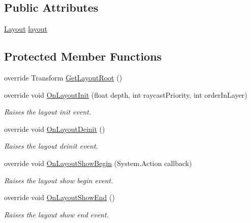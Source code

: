 \subsection*{Public Attributes}
\begin{DoxyCompactItemize}
\item 
\hyperlink{class_unity_engine_1_1_u_i_1_1_windows_1_1_types_1_1_layout}{Layout} \hyperlink{class_unity_engine_1_1_u_i_1_1_windows_1_1_types_1_1_layout_window_type_aac7a6f13d9873bb939b88f6f0e653866}{layout}
\end{DoxyCompactItemize}
\subsection*{Protected Member Functions}
\begin{DoxyCompactItemize}
\item 
override Transform \hyperlink{class_unity_engine_1_1_u_i_1_1_windows_1_1_types_1_1_layout_window_type_aaf0d9668fd474249fcd8f6f0bc7039e6}{Get\+Layout\+Root} ()
\item 
override void \hyperlink{class_unity_engine_1_1_u_i_1_1_windows_1_1_types_1_1_layout_window_type_ab2749bd8b74360304b44be574ad7825e}{On\+Layout\+Init} (float depth, int raycast\+Priority, int order\+In\+Layer)
\begin{DoxyCompactList}\small\item\em Raises the layout init event. \end{DoxyCompactList}\item 
override void \hyperlink{class_unity_engine_1_1_u_i_1_1_windows_1_1_types_1_1_layout_window_type_a3b98f0986a1e0ec4afeb6291857100cd}{On\+Layout\+Deinit} ()
\begin{DoxyCompactList}\small\item\em Raises the layout deinit event. \end{DoxyCompactList}\item 
override void \hyperlink{class_unity_engine_1_1_u_i_1_1_windows_1_1_types_1_1_layout_window_type_a63ea1b1a9fc020e1b4c559f037069c6e}{On\+Layout\+Show\+Begin} (System.\+Action callback)
\begin{DoxyCompactList}\small\item\em Raises the layout show begin event. \end{DoxyCompactList}\item 
override void \hyperlink{class_unity_engine_1_1_u_i_1_1_windows_1_1_types_1_1_layout_window_type_a7ccf902193f6a7531f414f2ad1952711}{On\+Layout\+Show\+End} ()
\begin{DoxyCompactList}\small\item\em Raises the layout show end event. \end{DoxyCompactList}\item 

\end{DoxyCompactItemize}
